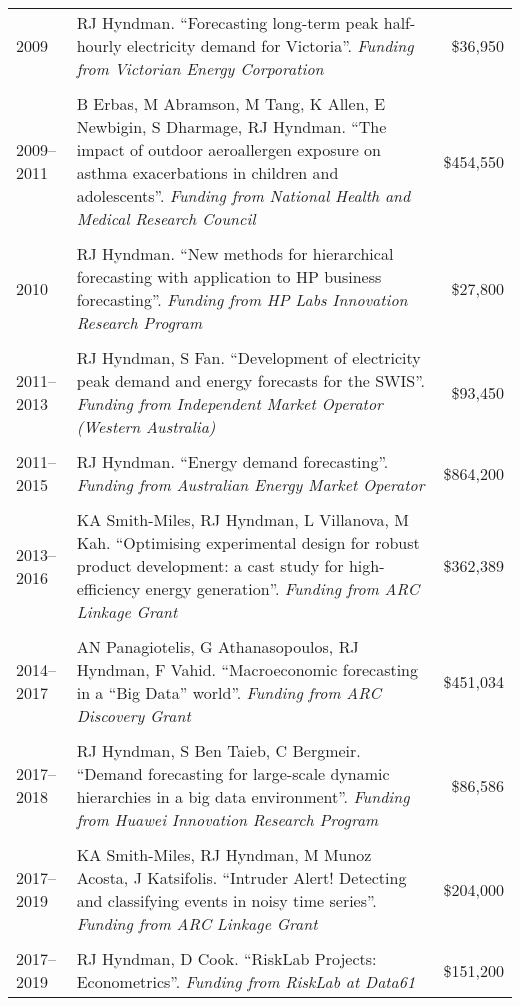 \documentclass[10pt,a4paper,]{article}
\begin{document}
\begin{tabular}{lp{13.3cm}r}
   \\[-0.2cm]2009 & RJ Hyndman. ``Forecasting long-term peak half-hourly electricity demand for Victoria''. \emph{Funding from Victorian Energy Corporation} & \$36,950 \\ 
   \\[-0.2cm]2009--2011 & B Erbas, M Abramson, M Tang, K Allen, E Newbigin, S Dharmage, RJ Hyndman. ``The impact of outdoor aeroallergen exposure on asthma exacerbations in children and adolescents''. \emph{Funding from National Health and Medical Research Council} & \$454,550 \\ 
   \\[-0.2cm]2010 & RJ Hyndman. ``New methods for hierarchical forecasting with application to HP business forecasting''. \emph{Funding from HP Labs Innovation Research Program} & \$27,800 \\ 
   \\[-0.2cm]2011--2013 & RJ Hyndman, S Fan. ``Development of electricity peak demand and energy forecasts for the SWIS''. \emph{Funding from Independent Market Operator (Western Australia)} & \$93,450 \\ 
   \\[-0.2cm]2011--2015 & RJ Hyndman. ``Energy demand forecasting''. \emph{Funding from Australian Energy Market Operator} & \$864,200 \\ 
   \\[-0.2cm]2013--2016 & KA Smith-Miles, RJ Hyndman, L Villanova, M Kah. ``Optimising experimental design for robust product development: a cast study for high-efficiency energy generation''. \emph{Funding from ARC Linkage Grant} & \$362,389 \\ 
   \\[-0.2cm]2014--2017 & AN Panagiotelis, G Athanasopoulos, RJ Hyndman, F Vahid. ``Macroeconomic forecasting in a “Big Data” world''. \emph{Funding from ARC Discovery Grant} & \$451,034 \\ 
   \\[-0.2cm]2017--2018 & RJ Hyndman, S Ben Taieb, C Bergmeir. ``Demand forecasting for large-scale dynamic hierarchies in a big data environment''. \emph{Funding from Huawei Innovation Research Program} & \$86,586 \\ 
   \\[-0.2cm]2017--2019 & KA Smith-Miles, RJ Hyndman, M Munoz Acosta, J Katsifolis. ``Intruder Alert! Detecting and classifying events in noisy time series''. \emph{Funding from ARC Linkage Grant} & \$204,000 \\ 
   \\[-0.2cm]2017--2019 & RJ Hyndman, D Cook. ``RiskLab Projects: Econometrics''. \emph{Funding from RiskLab at Data61} & \$151,200 \\ 

\end{tabular}
\end{document}
